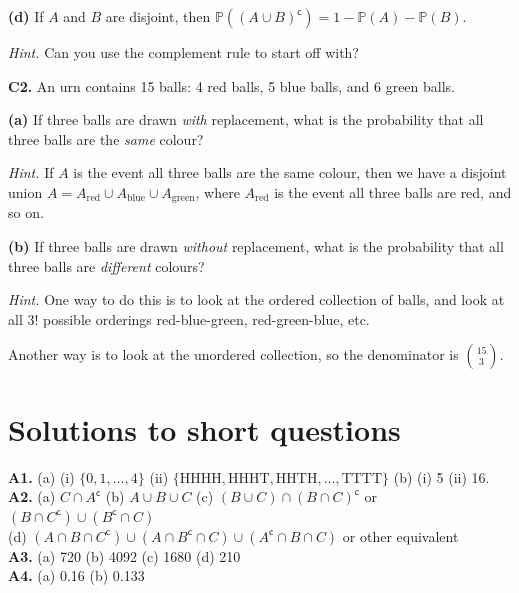 \documentclass[
  a4paper,
]{book}
\theoremstyle{definition}
\theoremstyle{definition}
\theoremstyle{definition}
\theoremstyle{definition}
\theoremstyle{remark}
\begin{document}
\textbf{(d)} If \(A\) and \(B\) are disjoint, then \(\mathbb P((A \cup B)^{\mathsf{c}}) = 1 - \mathbb P(A) - \mathbb P(B)\).

\begin{myanswers}
\emph{Hint.} Can you use the complement rule to start off with?

\end{myanswers}

\textbf{C2.} An urn contains 15 balls: 4 red balls, 5 blue balls, and 6 green balls.

\textbf{(a)} If three balls are drawn \emph{with} replacement, what is the probability that all three balls are the \emph{same} colour?

\begin{myanswers}
\emph{Hint.} If \(A\) is the event all three balls are the same colour, then we have a disjoint union \(A = A_{\text{red}} \cup A_{\text{blue}} \cup A_{\text{green}}\), where \(A_{\text{red}}\) is the event all three balls are red, and so on.

\end{myanswers}

\textbf{(b)} If three balls are drawn \emph{without} replacement, what is the probability that all three balls are \emph{different} colours?

\begin{myanswers}
\emph{Hint.} One way to do this is to look at the ordered collection of balls, and look at all \(3!\) possible orderings red-blue-green, red-green-blue, etc.

Another way is to look at the unordered collection, so the denominator is \(\binom{15}{3}\).

\end{myanswers}

\hypertarget{P2-short-sols}{%
\section*{Solutions to short questions}\label{P2-short-sols}}

\textbf{A1.} (a) (i) \(\{0,1,\dots, 4\}\) (ii) \(\{ \text{HHHH}, \text{HHHT}, \text{HHTH},\dots, \text{TTTT} \}\) (b) (i) 5 (ii) 16.\\
\textbf{A2.} (a) \(C \cap A^\mathsf{c}\) (b) \(A \cup B \cup C\) (c) \((B \cup C) \cap (B \cap C)^\mathsf{c}\) or \((B \cap C^\mathsf{c}) \cup (B^\mathsf{c}\cap C)\)\\
(d) \((A \cap B \cap C^\mathsf{c}) \cup (A \cap B^\mathsf{c}\cap C) \cup (A^\mathsf{c}\cap B \cap C)\) or other equivalent\\
\textbf{A3.} (a) 720 (b) 4092 (c) 1680 (d) 210\\
\textbf{A4.} (a) 0.16 (b) 0.133
\end{document}

